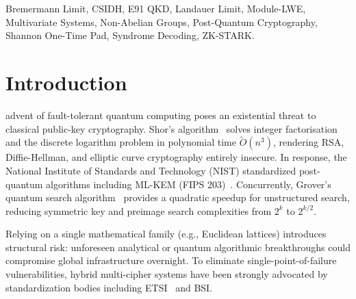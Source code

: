 \documentclass{ieeeaccess}
\begin{document}
\begin{keywords}
Bremermann Limit, CSIDH, E91 QKD, Landauer Limit, Module-LWE, Multivariate Systems, Non-Abelian Groups, Post-Quantum Cryptography, Shannon One-Time Pad, Syndrome Decoding, ZK-STARK.
\end{keywords}

\maketitle

\section{Introduction}
\label{sec:intro}

 advent of fault-tolerant quantum computing poses an existential threat to classical public-key cryptography. Shor's algorithm~\cite{Shor1994} solves integer factorisation and the discrete logarithm problem in polynomial time $\widetilde{O}(n^3)$, rendering RSA, Diffie-Hellman, and elliptic curve cryptography entirely insecure. In response, the National Institute of Standards and Technology (NIST) standardized post-quantum algorithms including ML-KEM (FIPS 203)~\cite{nist-pqc2024}. Concurrently, Grover's quantum search algorithm~\cite{Grover1996} provides a quadratic speedup for unstructured search, reducing symmetric key and preimage search complexities from $2^k$ to $2^{k/2}$.

Relying on a single mathematical family (e.g., Euclidean lattices) introduces structural risk: unforeseen analytical or quantum algorithmic breakthroughs could compromise global infrastructure overnight. To eliminate single-point-of-failure vulnerabilities, hybrid multi-cipher systems have been strongly advocated by standardization bodies including ETSI~\cite{ETSI2020} and BSI.
\end{document}
